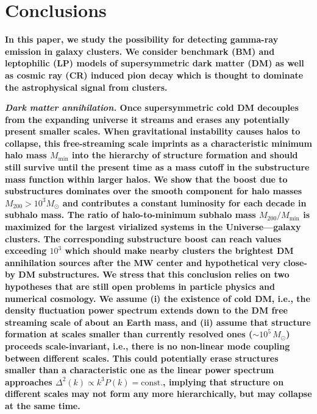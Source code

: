 \documentclass[10pt,aps,pra,reprint,amsmath,amsfonts,amssymb,showpacs,nofootinbib,floatfix]{revtex4-1}
\def\C#1{{\bf #1}}
\newcommand{\rmn}{\mathrm}
\newcommand{\msun}{M_\odot}
\newcommand{\mvir}{M_{200}}
\begin{document}
{\section{Conclusions}

\C{In this paper, we study the possibility for detecting gamma-ray
  emission in galaxy clusters. We consider benchmark (BM) and
  leptophilic (LP) models of supersymmetric dark matter (DM) as well
  as cosmic ray (CR) induced pion decay which is thought to dominate
  the astrophysical signal from clusters.}

\C{{\em Dark matter annihilation.} Once supersymmetric cold DM
  decouples from the expanding universe it streams and erases any
  potentially present smaller scales. When gravitational instability
  causes halos to collapse, this free-streaming scale imprints as a
  characteristic minimum halo mass $M_\mathrm{min}$ into the hierarchy
  of structure formation and should still survive until the present
  time as a mass cutoff in the substructure mass function within
  larger halos. We show that the boost due to substructures dominates
  over the smooth component for halo masses $\mvir>10^3 \msun$ and
  contributes a constant luminosity for each decade in subhalo
  mass. The ratio of halo-to-minimum subhalo mass
  $\mvir/M_\mathrm{min}$ is maximized for the largest virialized
  systems in the Universe---galaxy clusters. The corresponding
  substructure boost can reach values exceeding $10^3$ which should
  make nearby clusters the brightest DM annihilation sources after the
  MW center and hypothetical very close-by DM substructures. We stress
  that this conclusion relies on two hypotheses that are still open
  problems in particle physics and numerical cosmology. We assume (i)
  the existence of cold DM, i.e., the density fluctuation power
  spectrum extends down to the DM free streaming scale of about an
  Earth mass, and (ii) assume that structure formation at scales
  smaller than currently resolved ones ($\sim 10^5\,\msun$) proceeds
  scale-invariant, i.e., there is no non-linear mode coupling between
  different scales. This could potentially erase structures smaller
  than a characteristic one as the linear power spectrum approaches
  $\Delta^2(k) \propto k^3 P(k)=\rmn{const.}$, implying that structure
  on different scales may not form any more hierarchically, but may
  collapse at the same time.}

}
\end{document}
